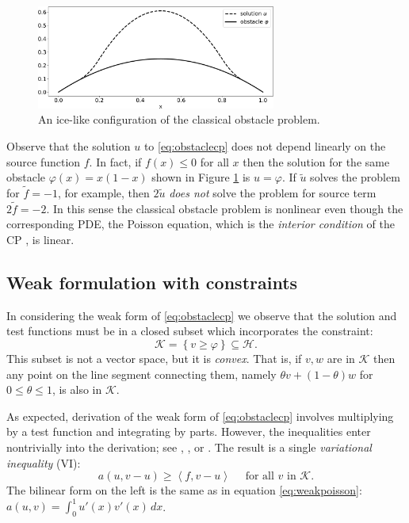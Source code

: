 \documentclass[letterpaper,final,12pt,reqno]{amsart}
\theoremstyle{claim}
\newcommand{\ip}[2]{\left<#1,#2\right>}
\numberwithin{equation}{section}
\numberwithin{figure}{section}
\numberwithin{table}{section}
\begin{document}
\begin{figure}
\includegraphics[width=0.7\textwidth]{fixfigs/icelike.pdf}
\caption{An ice-like configuration of the classical obstacle problem.}
\label{fig:icelike}
\end{figure}

Observe that the solution $u$ to \eqref{eq:obstaclecp} does not depend linearly on the source function $f$.  In fact, if $f(x)\le 0$ for all $x$ then the solution for the same obstacle $\varphi(x)=x(1-x)$ shown in Figure \ref{fig:icelike} is $u=\varphi$.  If $\tilde u$ solves the problem for $\tilde f= -1$, for example, then $2\tilde u$ \emph{does not} solve the problem for source term $2\tilde f = -2$.  In this sense the classical obstacle problem is nonlinear even though the corresponding PDE, the Poisson equation, which is the \emph{interior condition} of the CP \cite{KinderlehrerStampacchia1980}, is linear.

\subsection*{Weak formulation with constraints}  In considering the weak form of \eqref{eq:obstaclecp} we observe that the solution and test functions must be in a closed subset which incorporates the constraint:
\begin{equation}
\mathcal{K} = \left\{v \ge \varphi\right\} \subseteq \mathcal{H}.  \label{eq:Kdefine}
\end{equation}
This subset is not a vector space, but it is \emph{convex}.  That is, if $v,w$ are in $\mathcal{K}$ then any point on the line segment connecting them, namely $\theta v + (1-\theta) w$ for $0 \le \theta \le 1$, is also in $\mathcal{K}$.

As expected, derivation of the weak form of \eqref{eq:obstaclecp} involves multiplying by a test function and integrating by parts.  However, the inequalities enter nontrivially into the derivation; see \cite[Chapter 12]{Bueler2021}, \cite{JouvetBueler2012}, or \cite{KinderlehrerStampacchia1980}.  The result is a single \emph{variational inequality} (VI):
\begin{equation}
  a(u,v-u) \ge \ip{f}{v-u} \quad \text{ for all } v \text{ in } \mathcal{K}. \label{eq:obstaclevi}
\end{equation}
The bilinear form on the left is the same as in equation \eqref{eq:weakpoisson}: $a(u,v) = \int_0^1 u'(x) v'(x)\,dx$.
\end{document}
